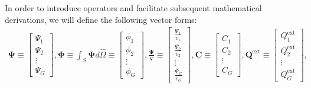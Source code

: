 In order to introduce operators and facilitate subsequent mathematical derivations, we will define
the following vector forms:
%
\begin{gather}
  \bm{\Psi} \equiv
  \begin{bmatrix}
    \Psi_1 \\
    \Psi_2 \\
    \vdots \\
    \Psi_G
  \end{bmatrix},
  \bm{\Phi} \equiv \int_S \bm{\Psi}d\hat{\Omega} \equiv
  \begin{bmatrix}
    \phi_1 \\
    \phi_2 \\
    \vdots \\
    \phi_G
  \end{bmatrix},
  \bm{\frac{\Psi}{v}} \equiv
  \begin{bmatrix}
    \frac{\Psi_1}{v_1} \\
    \frac{\Psi_2}{v_2} \\
    \vdots \\
    \frac{\Psi_G}{v_G}
  \end{bmatrix},
  \bm{C} \equiv
  \begin{bmatrix}
    C_1 \\
    C_2 \\
    \vdots \\
    C_G
  \end{bmatrix},
  \bm{Q}^{\text{ext}} \equiv
  \begin{bmatrix}
    Q^\text{ext}_1 \\
    Q^\text{ext}_2 \\
    \vdots \\
    Q^\text{ext}_G
  \end{bmatrix}, \nonumber
\end{gather}
